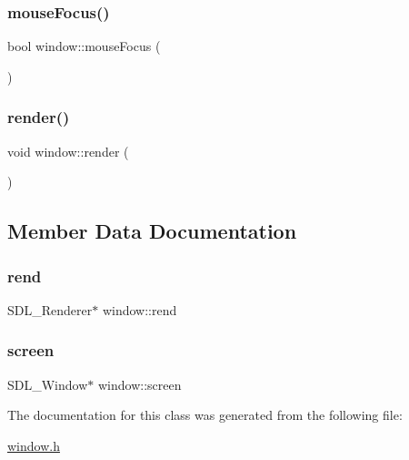 \subsubsection{\texorpdfstring{mouse\+Focus()}{mouseFocus()}}
{\footnotesize\ttfamily bool window\+::mouse\+Focus (\begin{DoxyParamCaption}{ }\end{DoxyParamCaption})}

\mbox{\label{classwindow_a0f16fe01af181d9a953bf8cf8f09ec9b}} 
\subsubsection{\texorpdfstring{render()}{render()}}
{\footnotesize\ttfamily void window\+::render (\begin{DoxyParamCaption}{ }\end{DoxyParamCaption})}



\subsection{Member Data Documentation}
\mbox{\label{classwindow_a1a6f43018b2e8d43531012fd854f74e1}} 
\subsubsection{\texorpdfstring{rend}{rend}}
{\footnotesize\ttfamily S\+D\+L\+\_\+\+Renderer$\ast$ window\+::rend}

\mbox{\label{classwindow_acc676834f8692a998b7346bdd1264ba2}} 
\subsubsection{\texorpdfstring{screen}{screen}}
{\footnotesize\ttfamily S\+D\+L\+\_\+\+Window$\ast$ window\+::screen}



The documentation for this class was generated from the following file\+:\begin{DoxyCompactItemize}
\item 
\hyperlink{window_8h}{window.\+h}\end{DoxyCompactItemize}
